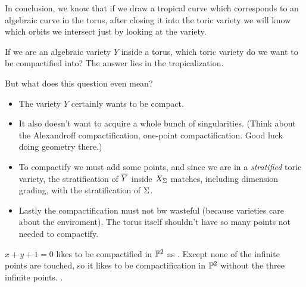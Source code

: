 \documentclass[12pt]{memoir}
\begin{document}
In conclusion, we know that if we draw a tropical curve which corresponds to an algebraic curve in the torus, after closing it into the toric variety we will know which orbits we intersect just by looking at the variety.\par 
If we are an algebraic variety $Y$ inside a torus, which toric variety do we want to be compactified into? The answer lies in the tropicalization.\par 
But what does this question even mean? 
\begin{itemize}
    \item The variety $Y$ certainly wants to be compact.
    \item It also doesn't want to acquire a whole bunch of singularities. (Think about the Alexandroff compactification, one-point compactification. Good luck doing geometry there.)
    \item To compactify we must add some points, and since we are in a \emph{stratified} toric variety, the stratification of $\overline Y$ inside $X_\Sigma$ matches, including dimension grading, with the stratification of $\Sigma$. 
    \item Lastly the compactification must not bw wasteful (because varieties care about the enviroment). The torus itself shouldn't have so many points not needed to compactify.
\end{itemize}
$x+y+1=0$ likes to be compactified in $\mathbb{P}^2$ as . Except none of the infinite points are touched, so it likes to be compactification in $\mathbb{P}^2$ without the three infinite points. .


\ifx\nextra\undefined
\printindex
\else\fi
\nocite{*}


\end{document}
